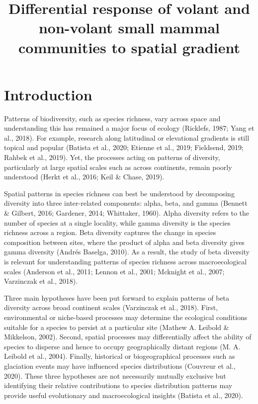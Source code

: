 \documentclass{article}
\begin{document}
\title{Differential response of volant and non-volant small mammal communities to spatial gradient}
\begin{titlepage}
\maketitle
\end{titlepage}






\section{Introduction}
Patterns of biodiversity, such as species richness, vary across space and understanding this has remained a major focus of ecology (Ricklefs, 1987; Yang et al., 2018). For example, research along latitudinal or elevational gradients is still topical and popular (Batista et al., 2020; Etienne et al., 2019; Fieldsend, 2019; Rahbek et al., 2019). Yet, the processes acting on patterns of diversity, particularly at large spatial scales such as across continents, remain poorly understood (Herkt et al., 2016; Keil \& Chase, 2019). 

\vspace{5mm}


Spatial patterns in species richness can best be understood by decomposing diversity into three inter-related components: alpha, beta, and gamma (Bennett \& Gilbert, 2016; Gardener, 2014; Whittaker, 1960). Alpha diversity refers to the number of species at a single locality, while gamma diversity is the species richness across a region. Beta diversity captures the change in species composition between sites, where the product of alpha and beta diversity gives gamma diversity (Andrés Baselga, 2010). As a result, the study of beta diversity is relevant for understanding patterns of species richness across macroecological scales (Anderson et al., 2011; Lennon et al., 2001; Mcknight et al., 2007; Varzinczak et al., 2018). 


\vspace{5mm}
Three main hypotheses have been put forward to explain patterns of beta diversity across broad continent scales (Varzinczak et al., 2018). First, environmental or niche-based processes may determine the ecological conditions suitable for a species to persist at a particular site (Mathew A. Leibold \& Mikkelson, 2002). Second, spatial processes may differentially affect the ability of species to disperse and hence to occupy geographically distant regions (M. A. Leibold et al., 2004). Finally, historical or biogeographical processes such as glaciation events may have influenced species distributions (Couvreur et al., 2020). These three hypotheses are not necessarily mutually exclusive but identifying their relative contributions to species distribution patterns may provide useful evolutionary and macroecological insights (Batista et al., 2020).
\end{document}
